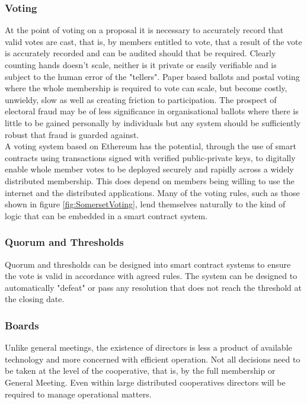 \subsubsection{Voting}
At the point of voting on a proposal it is necessary to accurately record that valid votes are cast, that is, by members entitled to vote, that a result of the vote is accurately recorded and can be audited should that be required.  Clearly counting hands doesn't scale, neither is it private or easily verifiable and is subject to the human error of the "tellers". Paper based ballots and postal voting where the whole membership is required to vote can scale, but become costly, unwieldy, slow as well as creating friction to participation.  The prospect of electoral fraud may be of less significance in organisational ballots where there is little to be gained personally by individuals but any system should be sufficiently robust that fraud is guarded against.\\

A voting system based on Ethereum has the potential, through the use of smart contracts using transactions signed with verified public-private keys, to digitally enable whole member votes to be deployed securely and rapidly across a widely distributed membership. This does depend on members being willing to use the internet and the distributed applications. Many of the voting rules, such as those shown in figure \ref{fig:SomersetVoting}, lend themselves naturally to the kind of logic that can be embedded in a smart contract system. \\

\subsubsection{Quorum and Thresholds}
Quorum and thresholds can be designed into smart contract systems to ensure the vote is valid in accordance with agreed rules. The system can be designed to automatically "defeat" or pass any resolution that does not reach the threshold at the closing date.\\

\subsubsection{Boards}
Unlike general meetings, the existence of directors is less a product of available technology and more concerned with efficient operation. Not all decisions need to be taken at the level of the cooperative, that is, by the full membership or General Meeting. Even within large distributed cooperatives directors will be required to manage operational matters. \\


